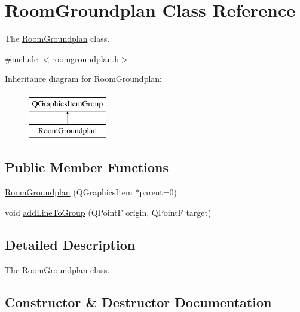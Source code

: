 \hypertarget{class_room_groundplan}{}\section{Room\+Groundplan Class Reference}
\label{class_room_groundplan}


The \hyperlink{class_room_groundplan}{Room\+Groundplan} class.  




{\ttfamily \#include $<$roomgroundplan.\+h$>$}

Inheritance diagram for Room\+Groundplan\+:\begin{figure}[H]
\begin{center}
\leavevmode
\includegraphics[height=2.000000cm]{class_room_groundplan}
\end{center}
\end{figure}
\subsection*{Public Member Functions}
\begin{DoxyCompactItemize}
\item 
\hyperlink{class_room_groundplan_a17876072e0ec924f8adbaa10ef0fb823}{Room\+Groundplan} (Q\+Graphics\+Item $\ast$parent=0)
\item 
void \hyperlink{class_room_groundplan_a5d9a4ec1560851a77f6797c41d713ac8}{add\+Line\+To\+Group} (Q\+PointF origin, Q\+PointF target)
\end{DoxyCompactItemize}


\subsection{Detailed Description}
The \hyperlink{class_room_groundplan}{Room\+Groundplan} class. 

\subsection{Constructor \& Destructor Documentation}
\mbox{\label{class_room_groundplan_a17876072e0ec924f8adbaa10ef0fb823}} 
